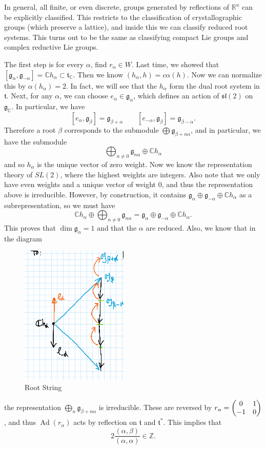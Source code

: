 \documentclass[leqno, openany]{memoir}
\theoremstyle{definition}
\theoremstyle{remark}
\theoremstyle{plain}
\theoremstyle{definition}
\theoremstyle{remark}
\newcommand{\R}{\mathbb{R}}
\newcommand{\C}{\mathbb{C}}
\newcommand{\Z}{\mathbb{Z}}
\newcommand{\mf}[1]{\mathfrak{#1}}
\DeclareMathOperator{\Ad}{Ad}
\begin{document}
In general, all finite, or even discrete, groups generated by reflections of $\R^n$ can be explicitly classified. This restricts to the classification of crystallographic groups (which preserve a lattice), and inside this we can classify reduced root systems. This turns out to be the same as classifying compact Lie groups and complex reductive Lie groups.

The first step is for every $\alpha$, find $r_{\alpha} \in W$. Last time, we showed that $[\mf{g}_{\alpha}, \mf{g}_{-\alpha}] = \C h_{\alpha} \subset \mf{t}_{\C}$. Then we know $(h_{\alpha}, h) = c \alpha(h)$. Now we can normalize this by $\alpha(h_{\alpha}) = 2$. In fact, we will see that the $h_{\alpha}$ form the dual root system in $\mf{t}$. Next, for any $\alpha$, we can choose $e_{\alpha} \in \mf{g}_{\alpha}$, which defines an action of $\mf{sl}(2)$ on $\mf{g}_{\C}$. In particular, we have
\[ [e_{\alpha}, \mf{g}_{\beta}] = \mf{g}_{\beta + \alpha} \qquad [e_{-\alpha}, \mf{g}_{\beta}] = \mf{g}_{\beta - \alpha}. \]
Therefore a root $\beta$ corresponds to the submodule $\bigoplus \mf{g}_{\beta + n \alpha}$, and in particular, we have the submodule
\[ \bigoplus_{n \neq 0} \mf{g}_{n\alpha} \oplus \C h_{\alpha} \]
and so $h_{\alpha}$ is the unique vector of zero weight. Now we know the representation theory of $SL(2)$, where the highest weights are integers. Also note that we only have even weights and a unique vector of weight $0$, and thus the representation above is irreducible. However, by construction, it contains $\mf{g}_{\alpha} \oplus \mf{g}_{-\alpha} \oplus \C h_{\alpha}$ as a subrepresentation, so we must have
\[ \C h_{\alpha} \oplus \bigoplus_{n \neq 0} \mf{g}_{n \alpha} = \mf{g}_{\alpha} \oplus \mf{g}_{-\alpha} \oplus \C h_{\alpha}. \]
This proves that $\dim \mf{g}_{\alpha} = 1$ and that the $\alpha$ are reduced. Also, we know that in the diagram
\begin{figure}[H]
    \centering
    \includegraphics[scale=0.6]{rootstring}
    \caption{Root String}%
    \label{fig:rootstring}
\end{figure}
the representation $\bigoplus_n \mf{g}_{\beta + n \alpha}$ is irreducible. These are reversed by $r_{\alpha} = \mqty(0 & 1 \\ - 1 & 0)$, and thus $\Ad(r_{\alpha})$ acts by reflection on $\mf{t}$ and $\mf{t}^*$. This implies that
\[ 2 \frac{(\alpha, \beta)}{(\alpha, \alpha)} \in \Z. \]
\end{document}
